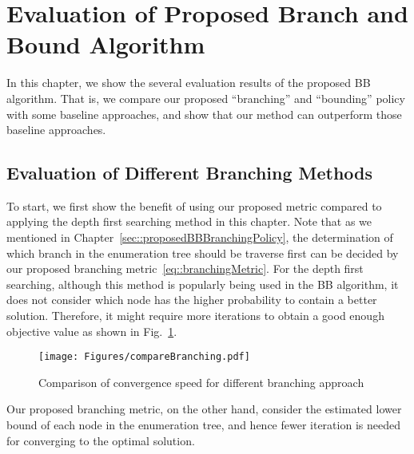 \section{Evaluation of Proposed Branch and Bound Algorithm}
In this chapter, we show the several evaluation results of the proposed BB algorithm.
That is, we compare our proposed ``branching'' and ``bounding'' policy with some baseline approaches, and show that our method can outperform those baseline approaches.

\subsection{Evaluation of Different Branching Methods}
To start, we first show the benefit of using our proposed metric compared to applying the depth first searching method in this chapter.
Note that as we mentioned in Chapter~\ref{sec::proposedBBBranchingPolicy}, the determination of which branch in the enumeration tree should be traverse first can be decided by our proposed branching metric~\eqref{eq::branchingMetric}.
For the depth first searching, although this method is popularly being used in the BB algorithm, it does not consider which node has the higher probability to contain a better solution.
Therefore, it might require more iterations to obtain a good enough objective value as shown in Fig.~\ref{fig::compareBranching}.
%
\begin{figure}
\begin{center}
\texttt{[image: Figures/compareBranching.pdf]}
\caption{\label{fig::compareBranching} Comparison of convergence speed for different branching approach}
\end{center}
\end{figure}
%
Our proposed branching metric, on the other hand, consider the estimated lower bound of each node in the enumeration tree, and hence fewer iteration is needed for converging to the optimal solution.

